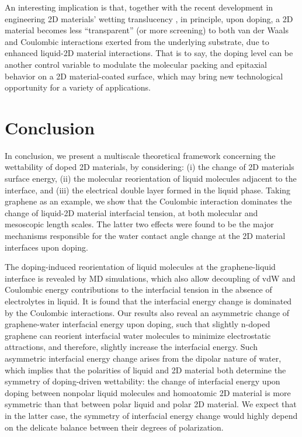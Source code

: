 \documentclass[journal=ancac3,manuscript=article,email=true,hyperref=true,keywords=true]{achemso}
\begin{document}
An interesting implication is that, together with the recent
development in engineering 2D materials’ wetting translucency
\cite{raj_wettability_2013,rafiee_wetting_2012,shih_breakdown_2012,shih_wetting_2013},
in principle, upon doping, a 2D material becomes less “transparent” (or more screening)
to both van der Waals and Coulombic interactions exerted from the underlying
substrate, due to enhanced liquid-2D material interactions. That is to say, the doping level can be
another control variable to modulate the molecular packing and
epitaxial behavior on a 2D material-coated surface, which may bring
new technological opportunity for a variety of applications.


\section{Conclusion}
\label{sec:org7ecbeb5}

In conclusion, we present a multiscale theoretical framework
concerning the wettability of doped 2D materials, by considering: (i)
the change of 2D materials surface energy, (ii) the molecular
reorientation of liquid molecules adjacent to the interface, and (iii)
the electrical double layer formed in the liquid phase. Taking
graphene as an example, we show that the Coulombic interaction
dominates the change of liquid-2D material interfacial tension, at
both molecular and mesoscopic length scales. The latter two effects were
found to be the major mechanisms responsible for the water contact angle
change at the 2D material interfaces upon doping.

The doping-induced reorientation of liquid molecules at the
graphene-liquid interface is revealed by MD simulations, which also
allow decoupling of vdW and Coulombic energy contributions to the
interfacial tension in the absence of electrolytes in liquid. It is
found that the interfacial energy change is dominated by the Coulombic
interactions. Our results also reveal an asymmetric change of
graphene-water interfacial energy upon doping, such that slightly
n-doped graphene can reorient interfacial water molecules to minimize
electrostatic attractions, and therefore, slightly increase the
interfacial energy. Such asymmetric interfacial energy change arises
from the dipolar nature of water, which implies that the polarities of
liquid and 2D material both determine the symmetry of
doping-driven wettability: the change of interfacial energy upon
doping between nonpolar liquid molecules and homoatomic 2D material is
more symmetric than that between polar liquid and polar 2D
material. We expect that in the latter case, the symmetry of
interfacial energy change would highly depend on the delicate balance
between their degrees of polarization.
\end{document}
